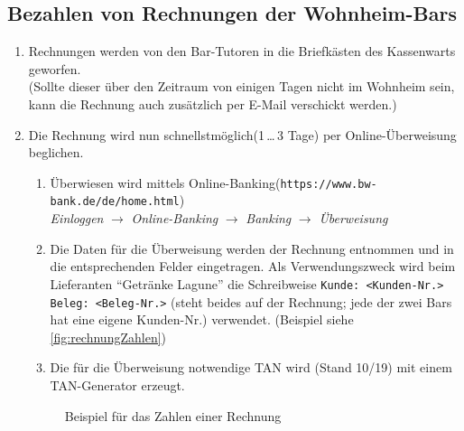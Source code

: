 \documentclass[10pt,a4paper,noendnumber=true]{scrartcl}
\begin{document}
\subsection{Bezahlen von Rechnungen der Wohnheim-Bars}
\begin{enumerate}
	\item Rechnungen werden von den Bar-Tutoren in die Briefkästen des Kassenwarts geworfen. 
	\\(Sollte dieser über den Zeitraum von einigen Tagen nicht im Wohnheim sein, kann die Rechnung auch zusätzlich per E-Mail verschickt werden.)
	
	\item Die Rechnung wird nun schnellstmöglich(1\,\ldots\,3 Tage) per Online-Überweisung beglichen.
	\begin{enumerate}
		\item Überwiesen wird mittels Online-Banking(\texttt{https://www.bw-bank.de/de/home.html})\\ \textit{Einloggen} $\rightarrow$ \textit{Online-Banking} $\rightarrow$ \textit{Banking} $\rightarrow$ \textit{Überweisung}
		
		\item Die Daten für die Überweisung werden der Rechnung entnommen und in die entsprechenden Felder eingetragen. Als Verwendungszweck wird beim Lieferanten "`Getränke Lagune"' die Schreibweise \texttt{Kunde: <Kunden-Nr.> Beleg: <Beleg-Nr.>} (steht beides auf der Rechnung; jede der zwei Bars hat eine eigene Kunden-Nr.) verwendet. (Beispiel siehe \autoref{fig:rechnungZahlen})
		
		\item Die für die Überweisung notwendige TAN wird (Stand 10/19) mit einem TAN-Generator erzeugt.
	\end{enumerate}

	\begin{figure}[H]
		\centering\setcounter{subfigure}{0}
		\qquad
		\caption{Beispiel für das Zahlen einer Rechnung}\label{fig:rechnungZahlen}
	\end{figure}
	

\end{enumerate}
\end{document}
